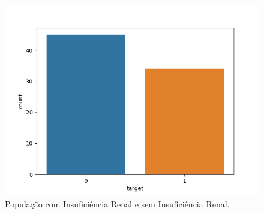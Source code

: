 \begin{figure}[H]
 \caption{População com Insuficiência Renal e sem Insuficiência Renal.}
 \label{fig:pop:targ:kindney}
 \centering
 \includegraphics[scale=0.3]{images/kindey_tot.png}
\end{figure}


